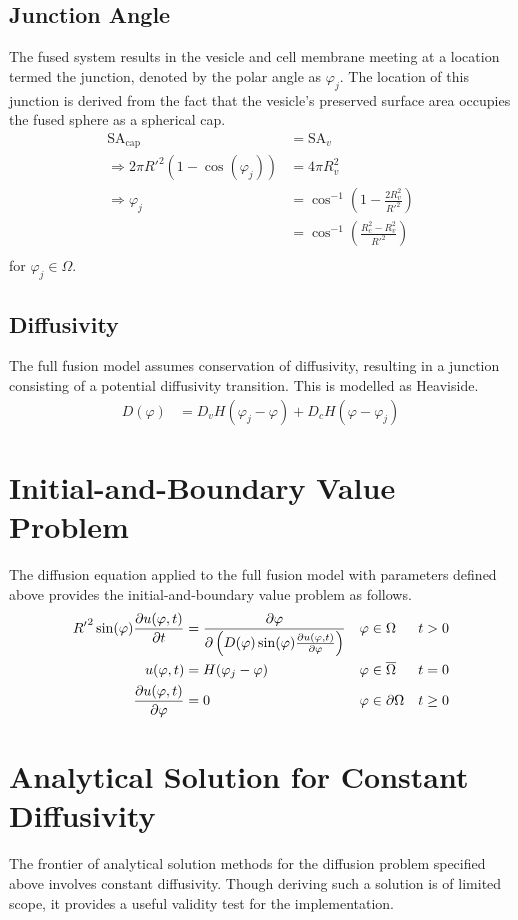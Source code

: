 \documentclass{report}
\newcommand\Par[1]{{ \left({#1}\right) }}
\newcommand\R{{ R' }}
\newcommand\SA{{ \text{SA} }}
\begin{document}
\subsection{Junction Angle}
The fused system results in the vesicle and cell membrane meeting at a location termed the junction, denoted by the polar angle as $\varphi_j$. The location of this junction is derived from the fact that the vesicle's preserved surface area occupies the fused sphere as a spherical cap.
\begin{align*}
	\SA_\text{cap} &= \SA_v \\
	\Rightarrow 2\pi \R^2 \Par{1 - \cos(\varphi_j)} &= 4\pi R_v^2 \\
	\Rightarrow \varphi_j &= \cos^{-1}\Par{1 - \frac{2R_v^2}{\R^2}} \\
	&= \cos^{-1}\Par{\frac{R_c^2 - R_v^2}{\R^2}} \\
\end{align*}
for $\varphi_j \in \Omega$.

\subsection{Diffusivity}
The full fusion model assumes conservation of diffusivity, resulting in a junction consisting of a potential diffusivity transition. This is modelled as Heaviside.
\begin{align*}
	D(\varphi) &= D_v H(\varphi_j - \varphi) + D_c H(\varphi - \varphi_j)
\end{align*}

\section{Initial-and-Boundary Value Problem}
The diffusion equation applied to the full fusion model with parameters defined above provides the initial-and-boundary value problem as follows.
\begin{align*}
	\R^2 \sin(\varphi) \pdv{u(\varphi, t)}{t} &= \pdv\varphi\Par{D(\varphi) \sin(\varphi) \pdv{u(\varphi, t)}{\varphi}}
	& \varphi &\in \Omega
	& t &> 0 \\
	u(\varphi, t) &= H(\varphi_j - \varphi)
	& \varphi &\in \overline\Omega
	& t &= 0 \\
	\pdv{u(\varphi, t)}{\varphi} &= 0 & \varphi &\in \partial\Omega & t &\geq 0
\end{align*}

\section{Analytical Solution for Constant Diffusivity}
The frontier of analytical solution methods for the diffusion problem specified above involves constant diffusivity. Though deriving such a solution is of limited scope, it provides a useful validity test for the implementation.
\end{document}
